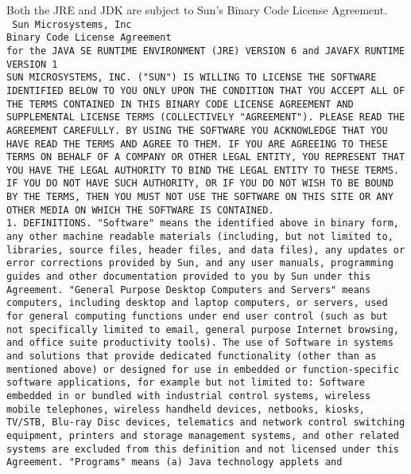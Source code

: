 \noindent
Both the JRE and JDK are subject to Sun's Binary Code License Agreement.
\\

\setlength{\baselineskip}{0.5\oldbaselineskip}
{\tiny\tt
\noindent
Sun Microsystems, Inc
\\
Binary Code License Agreement
\\
for the JAVA SE RUNTIME ENVIRONMENT (JRE) VERSION 6 and JAVAFX RUNTIME VERSION 1
\\[4pt]
SUN MICROSYSTEMS, INC. ("SUN") IS WILLING TO LICENSE THE SOFTWARE
IDENTIFIED BELOW TO YOU ONLY UPON THE CONDITION THAT YOU ACCEPT ALL OF
THE TERMS CONTAINED IN THIS BINARY CODE LICENSE AGREEMENT AND
SUPPLEMENTAL LICENSE TERMS (COLLECTIVELY "AGREEMENT"). PLEASE READ THE
AGREEMENT CAREFULLY. BY USING THE SOFTWARE YOU ACKNOWLEDGE THAT YOU
HAVE READ THE TERMS AND AGREE TO THEM. IF YOU ARE AGREEING TO THESE
TERMS ON BEHALF OF A COMPANY OR OTHER LEGAL ENTITY, YOU REPRESENT THAT
YOU HAVE THE LEGAL AUTHORITY TO BIND THE LEGAL ENTITY TO THESE
TERMS. IF YOU DO NOT HAVE SUCH AUTHORITY, OR IF YOU DO NOT WISH TO BE
BOUND BY THE TERMS, THEN YOU MUST NOT USE THE SOFTWARE ON THIS SITE OR
ANY OTHER MEDIA ON WHICH THE SOFTWARE IS CONTAINED.
\\[4pt]
   1. DEFINITIONS. "Software" means the identified above in binary
   form, any other machine readable materials (including, but not
   limited to, libraries, source files, header files, and data files),
   any updates or error corrections provided by Sun, and any user
   manuals, programming guides and other documentation provided to you
   by Sun under this Agreement. "General Purpose Desktop Computers and
   Servers" means computers, including desktop and laptop computers,
   or servers, used for general computing functions under end user
   control (such as but not specifically limited to email, general
   purpose Internet browsing, and office suite productivity
   tools). The use of Software in systems and solutions that provide
   dedicated functionality (other than as mentioned above) or designed
   for use in embedded or function-specific software applications, for
   example but not limited to: Software embedded in or bundled with
   industrial control systems, wireless mobile telephones, wireless
   handheld devices, netbooks, kiosks, TV/STB, Blu-ray Disc devices,
   telematics and network control switching equipment, printers and
   storage management systems, and other related systems are excluded
   from this definition and not licensed under this
   Agreement. "Programs" means (a) Java technology applets and
}
